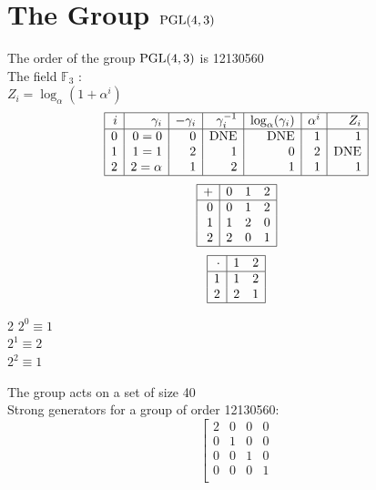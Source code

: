 \documentclass{article}
\begin{document}
{\section{The Group ${\rm PGL}(4,3)$}
\noindent The order of the group ${\rm PGL}(4,3)$ is 12130560\\
\noindent The field ${\mathbb F}_{3}$ :\\
\small
$Z_i = \log_\alpha (1 + \alpha^i)$\\
$$\begin{array}{|*{7}{r|}}
\hline
i & \gamma_i & -\gamma_i& \gamma_i^{-1}& \log_\alpha(\gamma_i)& \alpha^i& Z_i\\
\hline
  0 & 0 = 0 &0 & \mbox{DNE} & \mbox{DNE} &1 &1\\
  1 &   1 = 1 &2 &1 &0 &2 & \mbox{DNE}\\
  2 &   2 = \alpha  &1 &2 &1 &1 &1\\
\hline
\end{array}
$$
$$
\begin{array}{|r|*{3}{r}|}
\hline
+  &         0 &         1 &         2\\
\hline
         0&         0&         1&         2\\
         1&         1&         2&         0\\
         2&         2&         0&         1\\
\hline
\end{array}
$$
$$
\begin{array}{|r|*{2}{r}|}
\hline
\cdot  &         1 &         2\\
\hline
         1&         1&         2\\
         2&         2&         1\\
\hline
\end{array}
$$
\begin{multicols}{2}
\noindent
$2^{0} \equiv 1$\\
$2^{1} \equiv 2$\\
$2^{2} \equiv 1$\\
\end{multicols}
\noindent The group acts on a set of size 40\\
Strong generators for a group of order 12130560:
$$
\left[
\begin{array}{*{4}{r}}
2 & 0 & 0 & 0\\
0 & 1 & 0 & 0\\
0 & 0 & 1 & 0\\
0 & 0 & 0 & 1\\
\end{array}
$$}
\end{document}
